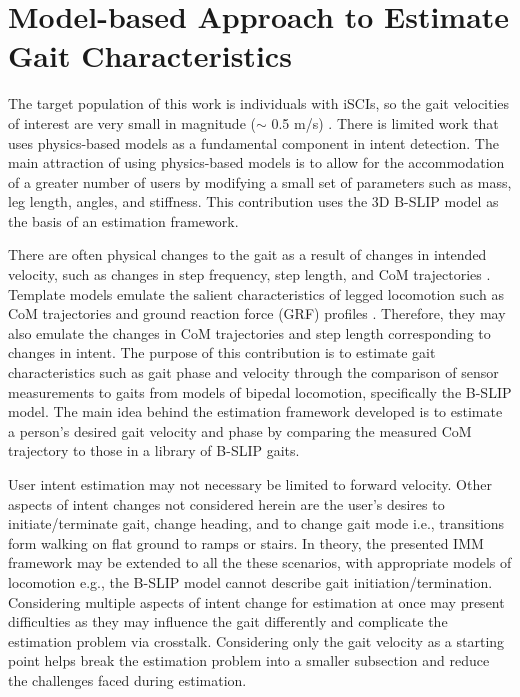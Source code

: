 \chapter{Model-based Approach to Estimate Gait Characteristics} \label{chapter:IMM}
The target population of this work is individuals with iSCIs, so the gait velocities of interest are very small in magnitude ($ \sim $ 0.5 m/s) \cite{nymark2005electromyographic}. There is limited work that uses physics-based models as a fundamental component in intent detection. The main attraction of using physics-based models is to allow for the accommodation of a greater number of users by modifying a small set of parameters such as mass, leg length, angles, and stiffness. This contribution uses the 3D B-SLIP model \cite{liu2015dynamic} as the basis of an estimation framework.

There are often physical changes to the gait as a result of changes in intended velocity, such as changes in step frequency, step length, and CoM trajectories \cite{kuo2001simple}. Template models emulate the salient characteristics of legged locomotion such as CoM trajectories and ground reaction force (GRF) profiles \cite{mochon1980ballistic}. Therefore, they may also emulate the changes in CoM trajectories and step length corresponding to changes in intent. The purpose of this contribution is to estimate gait characteristics such as gait phase and velocity through the comparison of sensor measurements to gaits from models of bipedal locomotion, specifically the B-SLIP model. The main idea behind the estimation framework developed is to estimate a person's desired gait velocity and phase by comparing the measured CoM trajectory to those in a library of B-SLIP gaits. 

User intent estimation may not necessary be limited to forward velocity. Other aspects of intent changes not considered herein are the user's desires to initiate/terminate gait, change heading, and to change gait mode i.e., transitions form walking on flat ground to ramps or stairs. In theory, the presented IMM framework may be extended to all the these scenarios, with appropriate models of locomotion e.g., the B-SLIP model cannot describe gait initiation/termination. Considering multiple aspects of intent change for estimation at once may present difficulties as they may influence the gait differently and complicate the estimation problem via crosstalk. Considering only the gait velocity as a starting point helps break the estimation problem into a smaller subsection and reduce the challenges faced during estimation.


